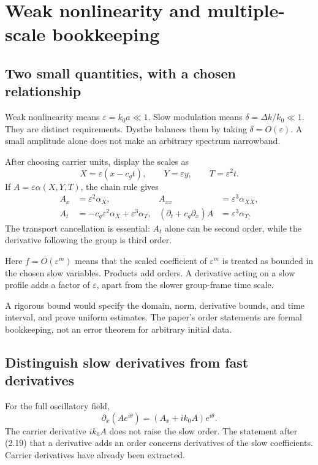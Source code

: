 \section{Weak nonlinearity and multiple-scale bookkeeping}
\label{sec:asymptotics}
\subsection{Two small quantities, with a chosen relationship}
Weak nonlinearity means $\varepsilon=k_0a\ll1$. Slow modulation means
$\delta=\Delta k/k_0\ll1$. They are distinct requirements. Dysthe balances
them by taking $\delta=O(\varepsilon)$. A small amplitude alone does not
make an arbitrary spectrum narrowband.

After choosing carrier units, display the scales as
\[
 X=\varepsilon(x-c_gt),\qquad Y=\varepsilon y,\qquad T=\varepsilon^2t.
\]
If $A=\varepsilon\alpha(X,Y,T)$, the chain rule gives
\begin{align*}
 A_x&=\varepsilon^2\alpha_X,& A_{xx}&=\varepsilon^3\alpha_{XX},\\
 A_t&=-c_g\varepsilon^2\alpha_X+\varepsilon^3\alpha_T,&
 (\partial_t+c_g\partial_x)A&=\varepsilon^3\alpha_T.
\end{align*}
The transport cancellation is essential: $A_t$ alone can be second order,
while the derivative following the group is third order.

\begin{definition}
Here $f=O(\varepsilon^m)$ means that the scaled coefficient of
$\varepsilon^m$ is treated as bounded in the chosen slow variables.
Products add orders. A derivative acting on a slow profile adds a factor
of $\varepsilon$, apart from the slower group-frame time scale.
\end{definition}
A rigorous bound would specify the domain, norm, derivative bounds, and
time interval, and prove uniform estimates. The paper's order statements
are formal bookkeeping, not an error theorem for arbitrary initial data.

\subsection{Distinguish slow derivatives from fast derivatives}
For the full oscillatory field,
\[
 \partial_x(Ae^{i\theta})=(A_x+ik_0A)e^{i\theta}.
\]
The carrier derivative $ik_0A$ does not raise the slow order. The statement
after (2.19) that a derivative adds an order concerns derivatives of the
slow coefficients. Carrier derivatives have already been extracted.

